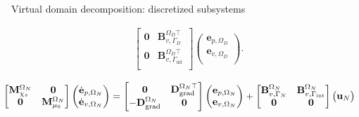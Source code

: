 \documentclass[aspectratio=169]{ISAE-Beamer}
\DeclareMathOperator*{\grad}{grad}
\renewcommand{\div}{\operatorname{div}}
\begin{document}
\begin{frame}{Virtual domain decomposition: discretized subsystems}
\begin{tcolorbox}[colframe=blue,title=Subdomain $\Omega_D$ (I.B.P. $\grad$),  coltitle=white]
\begin{equation*}
\begin{aligned}
	\begin{bmatrix}
	\mathbf{0} & \mathbf{B}_{v, \Gamma_{D}}^{\Omega_D \top} \\ 
	\mathbf{0} & \mathbf{B}_{v, \Gamma_{\text{int}}}^{\Omega_D \top} \\ 
	\end{bmatrix}
	\begin{pmatrix}
	{\mathbf{e}}_{p, \Omega_D} \\
	{\mathbf{e}}_{v, \Omega_D} \\
	\end{pmatrix}.
	\end{aligned}	
	\end{equation*}
\end{tcolorbox} 
\begin{tcolorbox}[colframe=red,title=Subdomain $\Omega_N$ (I.B.P. $\div$), coltitle=white]%
	\setlength{\abovedisplayskip}{1pt}
	\setlength{\belowdisplayskip}{1pt}
	\begin{equation*}
	\hspace*{-0.3cm}
	\begin{aligned}
	\begin{bmatrix}
	\mathbf{M}_{\chi_s}^{\Omega_N} & \mathbf{0} \\
	\mathbf{0} & \mathbf{M}_{\mu_0}^{\Omega_N} \\
	\end{bmatrix}
	\begin{pmatrix}
	\dot{\mathbf{e}}_{p, \Omega_N} \\
	\dot{\mathbf{e}}_{v, \Omega_N} \\
	\end{pmatrix}
	&= \begin{bmatrix}
	\mathbf{0} & \mathbf{D}_{\grad}^{\Omega_N \top}\\
	-\mathbf{D}_{\grad}^{\Omega_N} & \mathbf{0}\\
	\end{bmatrix}
	\begin{pmatrix}
	{\mathbf{e}}_{p, \Omega_N}\\
	{\mathbf{e}}_{v, \Omega_N}\\
	\end{pmatrix} + \begin{bmatrix}
	\mathbf{B}_{v, \Gamma_{N}}^{\Omega_N} & \mathbf{B}_{v, \Gamma_{\text{int}}}^{\Omega_N}\\
	\mathbf{0} & \mathbf{0}\\
	\end{bmatrix}
	\begin{pmatrix}
	\mathbf{u}_N \\

\end{pmatrix}
\end{aligned}
\end{equation*}
\end{tcolorbox}
\end{frame}
\end{document}

